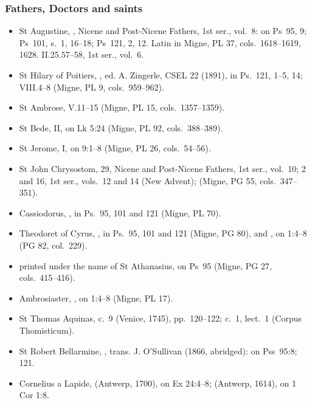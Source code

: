 {\subsubsection*{Fathers, Doctors and saints}
\begin{itemize}\setlength{\itemsep}{0.15em}\setlength{\parskip}{0pt}
\item St Augustine, , Nicene and Post-Nicene Fathers, 1st ser., vol.~8: on Ps~95, 9; Ps~101, s.~1, 16--18; Ps~121, 2, 12. Latin in Migne, PL 37, cols.~1618--1619, 1628.  II.25.57--58, 1st ser., vol.~6.
\item St Hilary of Poitiers, , ed. A. Zingerle, CSEL 22 (1891), in Ps.~121, 1--5, 14;  VIII.4--8 (Migne, PL 9, cols.~959--962).
\item St Ambrose,  V.11--15 (Migne, PL 15, cols.~1357--1359).
\item St Bede,  II, on Lk 5:24 (Migne, PL 92, cols.~388--389).
\item St Jerome,  I, on 9:1--8 (Migne, PL 26, cols.~54--56).
\item St John Chrysostom,  29, Nicene and Post-Nicene Fathers, 1st ser., vol.~10;  2 and  16, 1st ser., vols.~12 and 14 (New Advent);  (Migne, PG 55, cols.~347--351).
\item Cassiodorus, , in Ps.~95, 101 and 121 (Migne, PL 70).
\item Theodoret of Cyrus, , in Ps.~95, 101 and 121 (Migne, PG 80), and , on 1:4--8 (PG 82, col.~229).
\item {} printed under the name of St Athanasius, on Ps~95 (Migne, PG 27, cols.~415--416).
\item Ambrosiaster, , on 1:4--8 (Migne, PL 17).
\item St Thomas Aquinas,  c.~9 (Venice, 1745), pp.~120--122;  c.~1, lect.~1 (Corpus Thomisticum).
\item St Robert Bellarmine, , trans. J. O'Sullivan (1866, abridged): on Pss~95:8; 121.
\item Cornelius a Lapide,  (Antwerp, 1700), on Ex 24:4--8;  (Antwerp, 1614), on 1 Cor 1:8.
\end{itemize}

}

